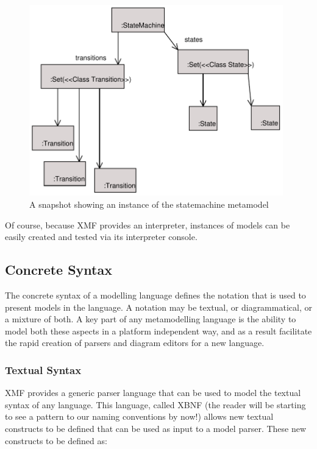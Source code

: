 \begin{figure}[htb]
\begin{center}
\includegraphics[width=11cm]{XMF/figures/snapshot.pdf}
\caption{A snapshot showing an instance of the statemachine
metamodel} \label{snapshotExample}
\end{center}
\end{figure}

Of course, because XMF provides an interpreter, instances of
models can be easily created and tested via its interpreter
console.

\subsection{Concrete Syntax}

The concrete syntax of a modelling language defines the notation
that is used to present models in the language. A notation may be
textual, or diagrammatical, or a mixture of both. A key part of
any metamodelling language is the ability to model both these
aspects in a platform independent way, and as a result facilitate
the rapid creation of parsers and diagram editors for a new
language.

\subsubsection{Textual Syntax}

XMF provides a generic parser language that can be used to model
the textual syntax of any language. This language, called XBNF
(the reader will be starting to see a pattern to our naming
conventions by now!) allows new textual constructs to be defined
that can be used as input to a model parser. These new constructs
to be defined as:


